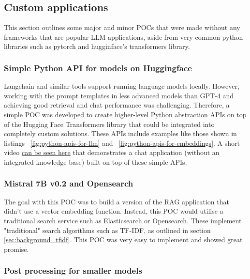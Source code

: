 \subsection{Custom applications}


This section outlines some major and minor \gls{POC}s that were made without any frameworks that are popular \gls{LLM} applications, aside from very common python libraries such as pytorch and hugginface’s transformers library.


\subsubsection{Simple Python API for models on Huggingface}


Langchain and similar tools support running language models locally. However, working with the prompt templates in less advanced models than GPT-4 and achieving good retrieval and chat performance was challenging. Therefore, a simple \gls{POC} was developed to create higher-level Python abstraction APIs on top of the Hugging Face Transformers library that could be integrated into completely custom solutions. These APIs include examples like those shown in listings ~\ref{fig:python-apis-for-llm} and ~\ref{fig:python-apis-for-embeddings}. A short video \href{https://www.youtube.com/watch?v=VG16oWK_LUQ}{can be seen here} that demonstrates a chat application (without an integrated knowledge base) built on-top of these simple APIs.






\subsubsection{Mistral 7B v0.2 and Opensearch}


The goal with this \gls{POC} was to build a version of the \gls{RAG} application that didn’t use a vector embedding function. Instead, this \gls{POC} would utilise a traditional search service such as Elasticsearch or Opensearch. These implement "traditional" search algorithms such as \gls{TF-IDF}, as outlined in section \ref{sec:background_tfidf}. This \gls{POC} was very easy to implement and showed great promise.


\subsubsection{Post processing for smaller models}
\label{sec:post_processing}


